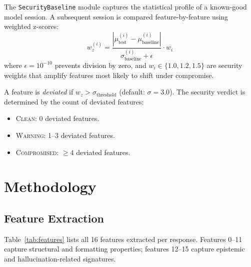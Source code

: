 \documentclass[11pt,twocolumn]{article}
\begin{document}
The \texttt{SecurityBaseline} module captures the statistical profile of a known-good model session.
A subsequent session is compared feature-by-feature using weighted z-scores:
\begin{equation}
    w_z^{(i)} = \frac{|\mu_{\text{test}}^{(i)} - \mu_{\text{baseline}}^{(i)}|}{\sigma_{\text{baseline}}^{(i)} + \epsilon} \cdot w_i
    \label{eq:wz}
\end{equation}
where $\epsilon = 10^{-10}$ prevents division by zero, and $w_i \in \{1.0, 1.2, 1.5\}$ are security weights that amplify features most likely to shift under compromise.

A feature is \emph{deviated} if $w_z > \sigma_{\text{threshold}}$ (default: $\sigma = 3.0$).
The security verdict is determined by the count of deviated features:
\begin{itemize}[nosep]
    \item \textsc{Clean}: 0 deviated features.
    \item \textsc{Warning}: 1--3 deviated features.
    \item \textsc{Compromised}: $\geq 4$ deviated features.
\end{itemize}

\section{Methodology}
\label{sec:methodology}

\subsection{Feature Extraction}
\label{sec:features}

Table~\ref{tab:features} lists all 16 features extracted per response.
Features 0--11 capture structural and formatting properties; features 12--15 capture epistemic and hallucination-related signatures.
\end{document}
